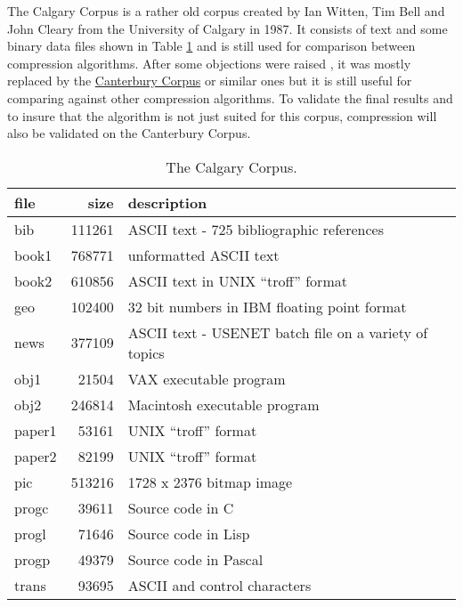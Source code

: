 \par{
The Calgary Corpus \cite{calgaryCorpus} is a rather old corpus created by Ian Witten, Tim Bell and John Cleary from the University of Calgary in 1987. It consists of text and some binary data files shown in Table \ref{tab:t05 The Calgary Corpus} and is still used for comparison between compression algorithms. After some objections were raised \cite{CalgaryCorpusCritic}, it was mostly replaced by the \href{http://corpus.canterbury.ac.nz/}{Canterbury Corpus} or similar ones but it is still useful for comparing against other compression algorithms. To validate the final results and to insure that the algorithm is not just suited for this corpus, compression will also be validated on the Canterbury Corpus.

\begin{table}[H]
	\centering
	\begin{tabular}{l|r|l}	
		file & size & description\\
		\hline
bib & 111261 & ASCII text - 725 bibliographic references\\
book1 & 768771 & unformatted ASCII text\\
book2 & 610856 & ASCII text in UNIX \enquote{troff} format\\
geo & 102400 & 32 bit numbers in IBM floating point format\\
news & 377109 & ASCII text - USENET batch file on a variety of topics\\
obj1 & 21504 & VAX executable program \\
obj2 & 246814 &	Macintosh executable program \\
paper1 & 53161 & UNIX \enquote{troff} format \\
paper2 & 82199 & UNIX \enquote{troff} format \\
pic & 513216 & 1728 x 2376 bitmap image\\
progc & 39611 & Source code in C \\
progl & 71646 &  Source code in Lisp\\
progp & 49379 & Source code in Pascal\\
trans & 93695 & ASCII and control characters\\	 
	\end{tabular}
	\caption{The Calgary Corpus.}
	\label{tab:t05 The Calgary Corpus}
\end{table}	
}

